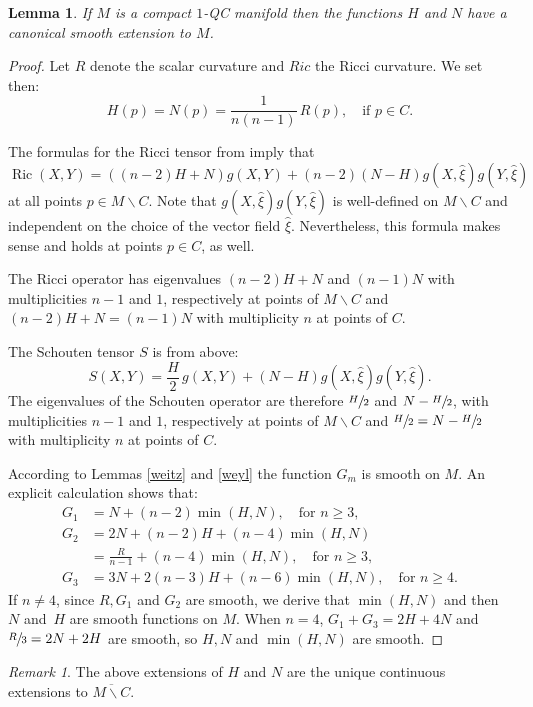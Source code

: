 \documentclass[JEP,XML,SOM,Unicode]{cedram}
\let\moins\smallsetminus
\DeclareMathOperator{\Ric}{Ric}
\newtheorem{lemma}[theorem]{Lemma}
\theoremstyle{definition}
\theoremstyle{remark}
\newtheorem{remark}[theorem]{Remark}
\numberwithin{equation}{section}
\begin{document}
\begin{lemma}\label{continuous}
If $M$ is a compact $1$-QC manifold
then the functions $H$ and $N$ have a canonical smooth
extension to $M$.
\end{lemma}
\begin{proof}
Let $R$ denote the scalar curvature and $Ric$ the Ricci curvature.
We set then:
\[H(p)=N(p)=\frac{1}{n(n-1)}\,R(p), \quad\text{if } p\in C.\]

The formulas for the Ricci tensor from \cite{BF,BP} imply that
\[ \Ric(X,Y)=((n-2)H+N)g(X,Y)+(n-2)(N-H)g(X,\widehat{\xi})g(Y,\widehat{\xi})\]
at all points $p\in M\moins C$. Note that
$g(X,\widehat{\xi})g(Y,\widehat{\xi})$ is well-defined on $M\moins C$
and independent on the choice of the vector field $\widehat{\xi}$.
Nevertheless, this formula makes sense
and holds at points $p\in C$, as well.

The Ricci operator has eigenvalues
$(n-2)H+N$ and $(n-1)N$ with multiplicities $n-1$ and $1$, respectively at points of $M\moins C$ and
$(n-2)H+N=(n-1)N$ with multiplicity $n$ at points of $C$.

The Schouten tensor $S$ is from above:
\[ S(X,Y)=\frac{H}{2}\,g(X,Y)+(N-H)g(X,\widehat{\xi})g(Y,\widehat{\xi}).\]
The eigenvalues of the Schouten operator are therefore
$\sfrac{H}{2}$ and $N-\sfrac{H}{2}$, with multiplicities $n-1$ and $1$, respectively at points of $M\moins C$ and
$\sfrac{H}{2}=N-\sfrac{H}{2}$ with multiplicity $n$ at points of $C$.

According to Lemmas \ref{weitz} and \ref{weyl} the function $G_m$ is smooth on $M$.
An explicit calculation shows that:
\begin{align*}
G_1&= N+(n-2)\min(H,N), \quad\text{for } n\geq3,\\[3pt]
G_2&=2N+ (n-2)H+(n-4)\min(H,N)\\[-5pt]
&=\frac{R}{n-1}+(n-4)\min(H,N), \quad\text{for } n\geq3,\\[3pt]
G_3&=3N+ 2(n-3)H+(n-6)\min(H,N), \quad\text{for } n\geq4.
\end{align*}
If $n\neq4$, since $R, G_1$ and $G_2$ are smooth, we derive that
$\min(H,N)$ and then $N$ and~$H$ are smooth functions on $M$.
When $n=4$, $G_1+G_3=2H+4N$ and $\sfrac{R}{3}=2N+2H$ are smooth, so
$H,N$ and $\min(H,N)$ are smooth.
\end{proof}
\begin{remark}
The above extensions of $H$ and $N$ are the unique continuous extensions to $\overline{M\moins C}$.
\end{remark}
\end{document}

